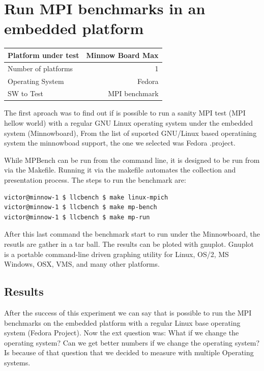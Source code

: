 \section{Run MPI benchmarks in an embedded platform}
    
    \begin{center}
    \begin{tabular}{ | l | r |}
        \hline
        Platform under test & Minnow Board  Max \\ \hline
        Number of platforms  & 1  \\ \hline
        Operating System & Fedora  \\ \hline
        SW to Test & MPI benchmark \\ \hline
    \end{tabular}
    \end{center}

The first aproach was to find out if is possible to run a sanity MPI test (MPI
hellow world) with a regular GNU Linux operating system under the embedded
system (Minnowboard\cite{minnowboard}),  From the list of suported GNU/Linux
based operatining system the minnowboad support, the one we selected was Fedora
\cite{fedora}.project. 


While MPBench can be run from the command line, it is designed to be run from
via the Makefile. Running it via the makefile automates the collection and
presentation process. The steps to run the benchmark are: 


\begin{lstlisting}[frame=single,language=bash]
victor@minnow-1 $ llcbench $ make linux-mpich
victor@minnow-1 $ llcbench $ make mp-bench
victor@minnow-1 $ llcbench $ make mp-run
\end{lstlisting}

After this last command the benchmark start to run under the Minnowboard, the
resutls are gather in a tar ball. The results can be ploted with gnuplot.
Gnuplot is a portable command-line driven graphing utility for Linux, OS/2, MS
Windows, OSX, VMS, and many other platforms. 

\subsection{Results}
After the success of this experiment we can say that is possible to run the MPI
benchmarks on the embedded platform with a regular Linux base operating system
(Fedora Project). Now the ext question was: What if we change the operating
system? Can we get better numbers if we change the operating system? Is because
of that question that we decided to measure with multiple Operating systems.



